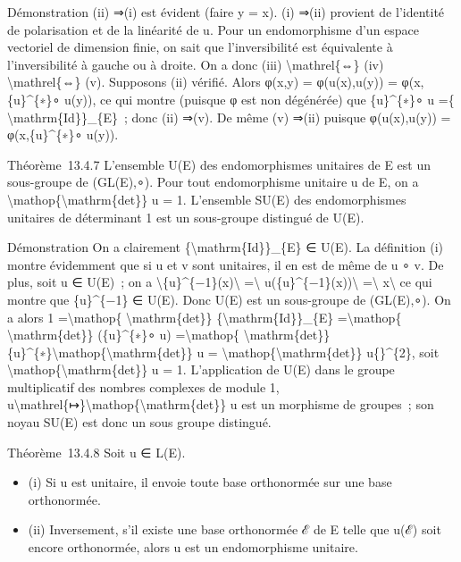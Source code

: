 \documentclass[]{article}
\begin{document}
Démonstration (ii) ⇒(i) est évident (faire y = x). (i) ⇒(ii) provient de
l'identité de polarisation et de la linéarité de u. Pour un
endomorphisme d'un espace vectoriel de dimension finie, on sait que
l'inversibilité est équivalente à l'inversibilité à gauche ou à droite.
On a donc (iii) \textbackslash{}mathrel\{⇔\} (iv)
\textbackslash{}mathrel\{⇔\} (v). Supposons (ii) vérifié. Alors φ(x,y) =
φ(u(x),u(y)) = φ(x,\{u\}\^{}\{∗\}∘ u(y)), ce qui montre (puisque φ est
non dégénérée) que \{u\}\^{}\{∗\}∘ u =\{
\textbackslash{}mathrm\{Id\}\}\_\{E\}~; donc (ii) ⇒(v). De même (v)
⇒(ii) puisque φ(u(x),u(y)) = φ(x,\{u\}\^{}\{∗\}∘ u(y)).

Théorème~13.4.7 L'ensemble U(E) des endomorphismes unitaires de E est un
sous-groupe de (GL(E),∘). Pour tout endomorphisme unitaire u de E, on a
\textbar{}\textbackslash{}mathop\{\textbackslash{}mathrm\{det\}\}
u\textbar{} = 1. L'ensemble SU(E) des endomorphismes unitaires de
déterminant 1 est un sous-groupe distingué de U(E).

Démonstration On a clairement \{\textbackslash{}mathrm\{Id\}\}\_\{E\} ∈
U(E). La définition (i) montre évidemment que si u et v sont unitaires,
il en est de même de u ∘ v. De plus, soit u ∈ U(E)~; on a
\textbackslash{}\textbar{}\{u\}\^{}\{−1\}(x)\textbackslash{}\textbar{}
=\textbackslash{}\textbar{}
u(\{u\}\^{}\{−1\}(x))\textbackslash{}\textbar{}
=\textbackslash{}\textbar{} x\textbackslash{}\textbar{} ce qui montre
que \{u\}\^{}\{−1\} ∈ U(E). Donc U(E) est un sous-groupe de (GL(E),∘).
On a alors 1 =\textbackslash{}mathop\{ \textbackslash{}mathrm\{det\}\}
\{\textbackslash{}mathrm\{Id\}\}\_\{E\} =\textbackslash{}mathop\{
\textbackslash{}mathrm\{det\}\} (\{u\}\^{}\{∗\}∘ u)
=\textbackslash{}mathop\{ \textbackslash{}mathrm\{det\}\}
\{u\}\^{}\{∗\}\textbackslash{}mathop\{\textbackslash{}mathrm\{det\}\} u
= \textbar{}\textbackslash{}mathop\{\textbackslash{}mathrm\{det\}\}
u\{\textbar{}\}\^{}\{2\}, soit
\textbar{}\textbackslash{}mathop\{\textbackslash{}mathrm\{det\}\}
u\textbar{} = 1. L'application de U(E) dans le groupe multiplicatif des
nombres complexes de module 1,
u\textbackslash{}mathrel\{↦\}\textbackslash{}mathop\{\textbackslash{}mathrm\{det\}\}
u est un morphisme de groupes~; son noyau SU(E) est donc un sous groupe
distingué.

Théorème~13.4.8 Soit u ∈ L(E).

\begin{itemize}
\itemsep1pt\parskip0pt
\item
  (i) Si u est unitaire, il envoie toute base orthonormée sur une base
  orthonormée.
\item
  (ii) Inversement, s'il existe une base orthonormée ℰ de E telle que
  u(ℰ) soit encore orthonormée, alors u est un endomorphisme unitaire.
\end{itemize}
\end{document}
